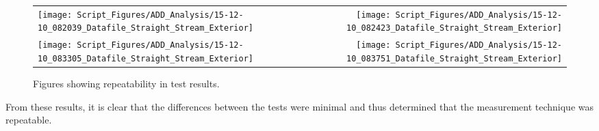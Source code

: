 \documentclass{article}
\begin{document}
\clearpage 

\begin{figure}[ht]
\begin{tabular*}{\textwidth}{lr}
\texttt{[image: Script\_Figures/ADD\_Analysis/15-12-10\_082039\_Datafile\_Straight\_Stream\_Exterior]} &
\texttt{[image: Script\_Figures/ADD\_Analysis/15-12-10\_082423\_Datafile\_Straight\_Stream\_Exterior]} \\
\texttt{[image: Script\_Figures/ADD\_Analysis/15-12-10\_083305\_Datafile\_Straight\_Stream\_Exterior]} &
\texttt{[image: Script\_Figures/ADD\_Analysis/15-12-10\_083751\_Datafile\_Straight\_Stream\_Exterior]} \\
\end{tabular*}
\caption{Figures showing repeatability in test results.}
\label{fig:Repeatability_Testing}
\end{figure}

\vspace*{\baselineskip}

From these results, it is clear that the differences between the tests were minimal and thus determined that the measurement technique was repeatable.

\clearpage


\end{document}
